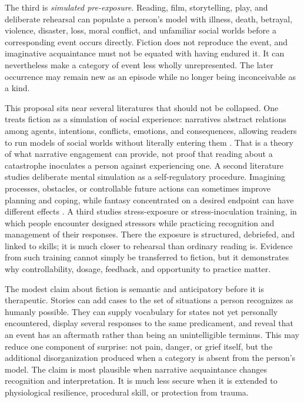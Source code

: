 \documentclass[11pt]{article}
\begin{document}
The third is \emph{simulated pre-exposure}. Reading, film, storytelling, play, and deliberate rehearsal can populate a person's model with illness, death, betrayal, violence, disaster, loss, moral conflict, and unfamiliar social worlds before a corresponding event occurs directly. Fiction does not reproduce the event, and imaginative acquaintance must not be equated with having endured it. It can nevertheless make a category of event less wholly unrepresented. The later occurrence may remain new as an episode while no longer being inconceivable as a kind.

This proposal sits near several literatures that should not be collapsed. One treats fiction as a simulation of social experience: narratives abstract relations among agents, intentions, conflicts, emotions, and consequences, allowing readers to run models of social worlds without literally entering them \citep{mar2008fiction,oatley2016fiction}. That is a theory of what narrative engagement can provide, not proof that reading about a catastrophe inoculates a person against experiencing one. A second literature studies deliberate mental simulation as a self-regulatory procedure. Imagining processes, obstacles, or controllable future actions can sometimes improve planning and coping, while fantasy concentrated on a desired endpoint can have different effects \citep{taylor1998imagination,rivkin1999mental}. A third studies stress-exposure or stress-inoculation training, in which people encounter designed stressors while practicing recognition and management of their responses. There the exposure is structured, debriefed, and linked to skills; it is much closer to rehearsal than ordinary reading is. Evidence from such training cannot simply be transferred to fiction, but it demonstrates why controllability, dosage, feedback, and opportunity to practice matter.

The modest claim about fiction is semantic and anticipatory before it is therapeutic. Stories can add cases to the set of situations a person recognizes as humanly possible. They can supply vocabulary for states not yet personally encountered, display several responses to the same predicament, and reveal that an event has an aftermath rather than being an unintelligible terminus. This may reduce one component of surprise: not pain, danger, or grief itself, but the additional disorganization produced when a category is absent from the person's model. The claim is most plausible when narrative acquaintance changes recognition and interpretation. It is much less secure when it is extended to physiological resilience, procedural skill, or protection from trauma.
\end{document}
